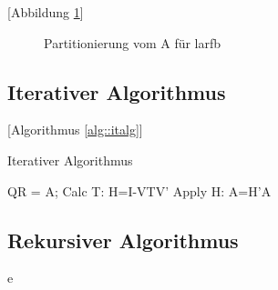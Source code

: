 [Abbildung \ref{fig:patrA}]
\begin{figure} 
	\centering
	
	\caption{Partitionierung vom A für larfb}
	\label{fig:patrA}
\end{figure}


\subsection{Iterativer Algorithmus}
[Algorithmus \ref{alg::italg}]
\begin{algorithm}
	\caption{Iterativer Algorithmus}
	\label{alg::italg}
	\begin{algorithmic}
			\State QR = A;
				\State Calc T: H=I-VTV'
				\State Apply H: A=H'A
			\EndIf
		\EndFor
	\end{algorithmic}
\end{algorithm}


\subsection{Rekursiver Algorithmus}


e
